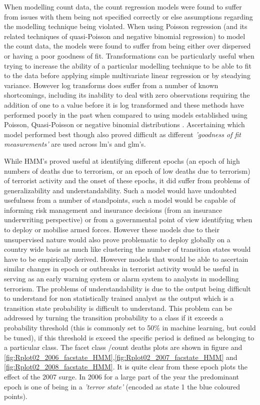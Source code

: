 When modelling count data, the count regression models were found to suffer from issues with them being not specified correctly or else assumptions regarding the modelling technique being violated.  When using Poisson regression (and its related techniques of quasi-Poisson and negative binomial regression) to model the count data, the models were found to suffer from being either over dispersed or having a poor goodness of fit. Transformations can be particularly useful when trying to increase the ability of a particular modelling technique to be able to fit to the data 
before applying simple multivariate linear regression or by steadying variance. However log transforms does suffer from a number of known shortcomings, including its inability to deal with zero observations requiring the addition of one to a value before it is log transformed and these methods have performed poorly in the past when compared to using models established using Poisson, Quasi-Poisson or negative binomial distributions \citep{o2010not}. Ascertaining which model performed best though also proved difficult as different \textit{'goodness of fit  measurements'} are used across lm's and glm's. 

While HMM's proved useful at identifying different epochs (an epoch of high numbers of deaths due to terrorism, or an epoch of low deaths due to terrorism) of terrorist activity and the onset of these epochs, it did suffer from problems of generalizability and understandability. Such a model would have undoubted usefulness from a number of standpoints, such a model would be capable of informing risk management and insurance decisions (from an insurance underwriting perspective) or from a governmental point of view identifying when to deploy or mobilise armed forces. However these models due to their unsupervised nature would also prove problematic to deploy globally on a country wide basis as much like clustering the number of transition states would have to be empirically derived. However models that would be able to ascertain similar changes in epoch or outbreaks in terrorist activity would be useful in serving as an early warning system or alarm system to analysts in modelling terrorism. The problems of understandability is due to the output being difficult to understand for non statistically trained analyst as the output which is a transition state probability is difficult to understand. This problem can be addressed by turning the transition probability to a class if it exceeds a probability threshold (this is commonly set to 50\% in machine learning, but could be tuned), if this threshold is exceed the specific period is defined as belonging to a particular class. The facet class /count deaths plots are shown in figure and \ref{fig:Rplot02_2006_facstate_HMM},\ref{fig:Rplot02_2007_facstate_HMM} and \ref{fig:Rplot02_2008_facstate_HMM}. It is quite clear from these epoch plots the effect of the 2007 surge. In 2006  for a large part of the year the predominant epoch is one of being in a \textit{'terror state'} (encoded as state 1 the blue coloured points). 

